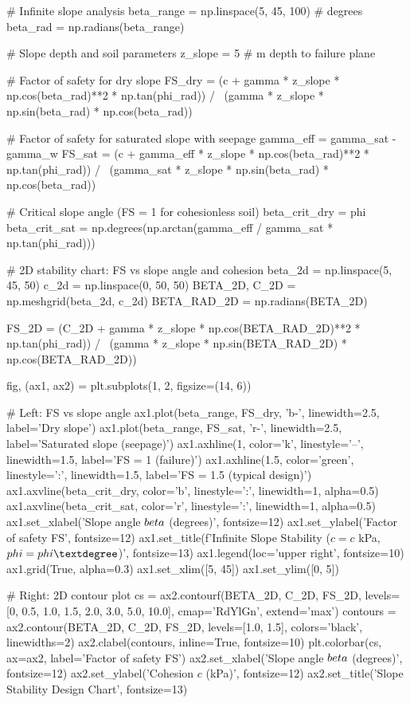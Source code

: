 \documentclass[11pt,a4paper]{article}
\begin{document}
\begin{pycode}
# Infinite slope analysis
beta_range = np.linspace(5, 45, 100)  # degrees
beta_rad = np.radians(beta_range)

# Slope depth and soil parameters
z_slope = 5  # m depth to failure plane

# Factor of safety for dry slope
FS_dry = (c + gamma * z_slope * np.cos(beta_rad)**2 * np.tan(phi_rad)) / \
         (gamma * z_slope * np.sin(beta_rad) * np.cos(beta_rad))

# Factor of safety for saturated slope with seepage
gamma_eff = gamma_sat - gamma_w
FS_sat = (c + gamma_eff * z_slope * np.cos(beta_rad)**2 * np.tan(phi_rad)) / \
         (gamma_sat * z_slope * np.sin(beta_rad) * np.cos(beta_rad))

# Critical slope angle (FS = 1 for cohesionless soil)
beta_crit_dry = phi
beta_crit_sat = np.degrees(np.arctan(gamma_eff / gamma_sat * np.tan(phi_rad)))

# 2D stability chart: FS vs slope angle and cohesion
beta_2d = np.linspace(5, 45, 50)
c_2d = np.linspace(0, 50, 50)
BETA_2D, C_2D = np.meshgrid(beta_2d, c_2d)
BETA_RAD_2D = np.radians(BETA_2D)

FS_2D = (C_2D + gamma * z_slope * np.cos(BETA_RAD_2D)**2 * np.tan(phi_rad)) / \
        (gamma * z_slope * np.sin(BETA_RAD_2D) * np.cos(BETA_RAD_2D))

fig, (ax1, ax2) = plt.subplots(1, 2, figsize=(14, 6))

# Left: FS vs slope angle
ax1.plot(beta_range, FS_dry, 'b-', linewidth=2.5, label='Dry slope')
ax1.plot(beta_range, FS_sat, 'r-', linewidth=2.5, label='Saturated slope (seepage)')
ax1.axhline(1, color='k', linestyle='--', linewidth=1.5, label='FS = 1 (failure)')
ax1.axhline(1.5, color='green', linestyle=':', linewidth=1.5, label='FS = 1.5 (typical design)')
ax1.axvline(beta_crit_dry, color='b', linestyle=':', linewidth=1, alpha=0.5)
ax1.axvline(beta_crit_sat, color='r', linestyle=':', linewidth=1, alpha=0.5)
ax1.set_xlabel('Slope angle $\\beta$ (degrees)', fontsize=12)
ax1.set_ylabel('Factor of safety FS', fontsize=12)
ax1.set_title(f'Infinite Slope Stability ($c={c}$ kPa, $\\phi={phi}°$)', fontsize=13)
ax1.legend(loc='upper right', fontsize=10)
ax1.grid(True, alpha=0.3)
ax1.set_xlim([5, 45])
ax1.set_ylim([0, 5])

# Right: 2D contour plot
cs = ax2.contourf(BETA_2D, C_2D, FS_2D, levels=[0, 0.5, 1.0, 1.5, 2.0, 3.0, 5.0, 10.0],
                  cmap='RdYlGn', extend='max')
contours = ax2.contour(BETA_2D, C_2D, FS_2D, levels=[1.0, 1.5], colors='black', linewidths=2)
ax2.clabel(contours, inline=True, fontsize=10)
plt.colorbar(cs, ax=ax2, label='Factor of safety FS')
ax2.set_xlabel('Slope angle $\\beta$ (degrees)', fontsize=12)
ax2.set_ylabel('Cohesion $c$ (kPa)', fontsize=12)
ax2.set_title('Slope Stability Design Chart', fontsize=13)


\end{pycode}
\end{document}

